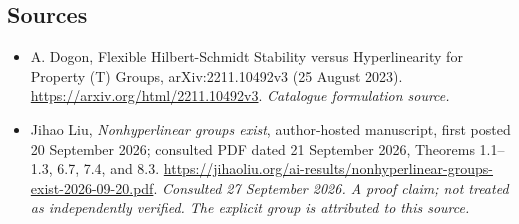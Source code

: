 \documentclass[11pt,a4paper]{article}
\numberwithin{equation}{section}
\begin{document}
\subsection{Sources}
\begin{itemize}\raggedright
\item[\textnormal{[S1]}]\hypertarget{source:154:1}{} A. Dogon, Flexible Hilbert-Schmidt Stability versus Hyperlinearity for Property (T) Groups, arXiv:2211.10492v3 (25 August 2023).
\url{https://arxiv.org/html/2211.10492v3}.
{\small\textit{Catalogue formulation source.}}
\item[\textnormal{[E1]}]\hypertarget{extra:154:1}{} Jihao Liu,
\emph{Nonhyperlinear groups exist}, author-hosted manuscript, first posted
20 September 2026; consulted PDF dated 21 September 2026, Theorems 1.1--1.3, 6.7, 7.4, and 8.3.
\url{https://jihaoliu.org/ai-results/nonhyperlinear-groups-exist-2026-09-20.pdf}.
{\small\textit{Consulted 27 September 2026. A proof claim; not treated as
independently verified. The explicit group is attributed to this source.}}
\end{itemize}
\end{document}
